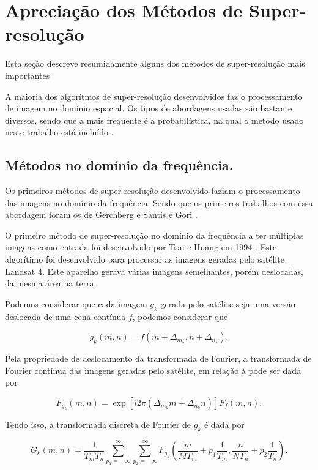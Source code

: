 \section{\label{sec:srmetodos}Apreciação dos Métodos de Super-resolução} 
Esta seção descreve resumidamente alguns dos métodos de super-resolução mais importantes 

A maioria dos algorítmos de super-resolução desenvolvidos faz o processamento de imagem no domínio espacial.
Os tipos de abordagens usadas são bastante diversos, sendo que a mais frequente é a probabilística, na qual o método usado neste trabalho está incluído \cite{nasrollahi2014super}.
\subsection{Métodos no domínio da frequência.}

Os primeiros métodos de super-resolução desenvolvido faziam o processamento das imagens no domínio da frequência.
Sendo que os primeiros trabalhos com essa abordagem foram os de Gerchberg \cite{Gerchberg1974} e Santis e Gori \cite{de1975iterative}.

O primeiro método de super-resolução no domínio da frequência a ter múltiplas imagens como entrada foi desenvolvido por Tsai e Huang em 1994 \cite{nasrollahi2014super}.
Este algorítimo foi desenvolvido para processar as imagens geradas pelo satélite Landsat 4.
Este aparelho gerava várias imagens semelhantes, porém deslocadas, da mesma área na
terra.

Podemos considerar que cada imagem $g_k$ gerada pelo satélite seja uma versão deslocada de uma cena contínua $f$, podemos considerar que

\begin{equation}
	g_k(m,n) = f(m + \Delta_{m_k}, n + \Delta_{n_k}).
\end{equation}

Pela propriedade de deslocamento da transformada de Fourier, a transformada de Fourier contínua das imagens geradas pelo satélite, em relação à pode ser dada por

\begin{equation}
	F_{g_k} (m,n) = \exp{[i2\pi (\Delta_{m_k}m + \Delta_{n_k}n)]} F_f (m,n).
\end{equation}

Tendo isso, a transformada discreta de Fourier de $g_k$ é dada por

\begin{equation}
	G_k(m,n) = \frac{1}{T_m T_n} \sum^\infty_{p_1=-\infty} \sum^\infty_{p_2=-\infty}
	F_{g_k} \left( \frac{m}{MT_m} + p_1 \frac{1}{T_m},
	\frac{n}{NT_n} + p_2\frac{1}{T_n} \right).
\end{equation}

